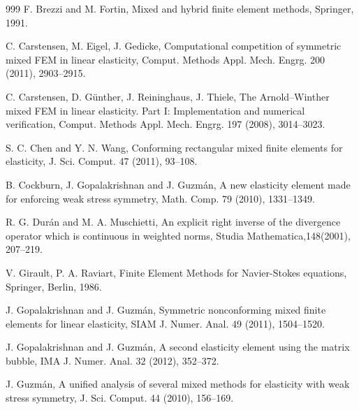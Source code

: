 \documentclass{amsart}
\numberwithin{table}{section}
\numberwithin{figure}{section}
\begin{document}
\begin{thebibliography}{999}
   F. Brezzi and  M. Fortin,
   Mixed and hybrid finite element methods, Springer, 1991.

C. Carstensen, M. Eigel, J. Gedicke,
  Computational competition of symmetric mixed FEM in linear
  elasticity, Comput. Methods Appl. Mech. Engrg. 200 (2011),
   2903--2915.

  C. Carstensen,  D. G\"{u}nther, J. Reininghaus, J. Thiele,
  The Arnold--Winther mixed FEM in linear elasticity. Part I:
  Implementation and numerical verification, Comput. Methods Appl.
   Mech. Engrg. 197 (2008), 3014--3023.

   S. C. Chen and Y. N. Wang,
Conforming rectangular mixed finite elements for elasticity, J.
Sci. Comput. 47 (2011),  93--108.



  B. Cockburn, J. Gopalakrishnan and J. Guzm\'an,
    A new elasticity element made for enforcing weak stress symmetry,
    Math. Comp. 79 (2010),  1331--1349.

R. G. Dur\'{a}n and M. A. Muschietti, An explicit right inverse of the divergence
operator which is continuous in weighted norms, Studia Mathematica,148(2001), 207--219.


 V. Girault, P. A. Raviart, Finite Element Methods for Navier-Stokes equations,
Springer, Berlin, 1986.


 J. Gopalakrishnan and J. Guzm\'an,
  Symmetric nonconforming mixed finite elements for linear elasticity,
 SIAM J. Numer. Anal. 49 (2011), 1504--1520.

 J. Gopalakrishnan and J. Guzm\'an,
    A second elasticity element using the matrix bubble,
    IMA J. Numer. Anal. 32 (2012),  352--372.


 J. Guzm\'an,
   A unified analysis of several mixed methods for elasticity
   with weak stress symmetry,
    J. Sci. Comput. 44 (2010),  156--169.


\end{thebibliography}
\end{document}
